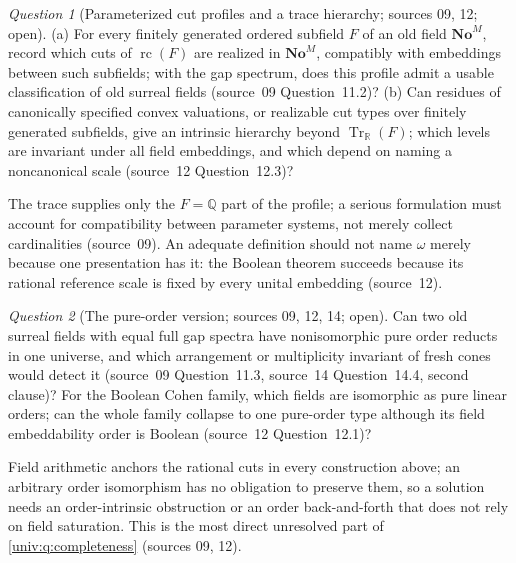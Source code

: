 \documentclass[11pt,letterpaper]{article}
\numberwithin{equation}{section}
\theoremstyle{definition}
\theoremstyle{remark}
\newtheorem{question}[question]{Question}
\newcommand{\No}{\mathbf{No}}
\newcommand{\NoM}{\No^{M}}
\newcommand{\R}{\mathbb R}
\newcommand{\Q}{\mathbb Q}
\newcommand{\rc}{\operatorname{rc}}
\newcommand{\Tr}{\operatorname{Tr}_{\R}}
\begin{document}
\begin{question}[Parameterized cut profiles and a trace hierarchy; sources 09, 12; open]\label{univ:gs:q:profile}
(a) For every finitely generated ordered subfield $F$ of an old field $\NoM$, record which cuts of
$\rc(F)$ are realized in $\NoM$, compatibly with embeddings between such subfields; with the gap
spectrum, does this profile admit a usable classification of old surreal fields (source~09
Question~11.2)? (b) Can residues of canonically specified convex valuations, or realizable cut
types over finitely generated subfields, give an intrinsic hierarchy beyond $\Tr(F)$; which
levels are invariant under all field embeddings, and which depend on naming a noncanonical scale
(source~12 Question~12.3)?
\end{question}
The trace supplies only the $F=\Q$ part of the profile; a serious formulation must account for
compatibility between parameter systems, not merely collect cardinalities (source~09). An
adequate definition should not name $\omega$ merely because one presentation has it: the
Boolean theorem succeeds because its rational reference scale is fixed by every unital
embedding (source~12).

\begin{question}[The pure-order version; sources 09, 12, 14; open]\label{univ:gs:q:order}
Can two old surreal fields with equal full gap spectra have nonisomorphic pure order reducts in
one universe, and which arrangement or multiplicity invariant of fresh cones would detect it
(source~09 Question~11.3, source~14 Question~14.4, second clause)? For the Boolean Cohen family,
which fields are isomorphic as pure linear orders; can the whole family collapse to one
pure-order type although its field embeddability order is Boolean (source~12 Question~12.1)?
\end{question}
Field arithmetic anchors the rational cuts in every construction above; an arbitrary order
isomorphism has no obligation to preserve them, so a solution needs an order-intrinsic
obstruction or an order back-and-forth that does not rely on field saturation. This is the most
direct unresolved part of \cref{univ:q:completeness} (sources 09, 12).
\end{document}
